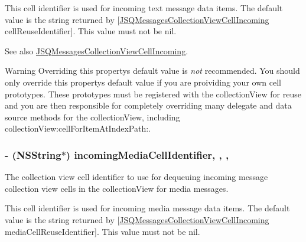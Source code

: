 This cell identifier is used for incoming text message data items. The default value is the string returned by {\ttfamily \mbox{[}\hyperlink{interface_j_s_q_messages_collection_view_cell_incoming}{J\+S\+Q\+Messages\+Collection\+View\+Cell\+Incoming} cell\+Reuse\+Identifier\mbox{]}}. This value must not be {\ttfamily nil}.

\begin{DoxySeeAlso}{See also}
\hyperlink{interface_j_s_q_messages_collection_view_cell_incoming}{J\+S\+Q\+Messages\+Collection\+View\+Cell\+Incoming}.
\end{DoxySeeAlso}
\begin{DoxyWarning}{Warning}
Overriding this property\textquotesingle{}s default value is {\itshape not} recommended. You should only override this property\textquotesingle{}s default value if you are proividing your own cell prototypes. These prototypes must be registered with the collection\+View for reuse and you are then responsible for completely overriding many delegate and data source methods for the collection\+View, including {\ttfamily collection\+View\+:cell\+For\+Item\+At\+Index\+Path\+:}. 
\end{DoxyWarning}
\hypertarget{interface_j_s_q_messages_view_controller_a2803500d4718ae80d36013c83044ec8e}{}
\subsubsection[{incoming\+Media\+Cell\+Identifier}]{\setlength{\rightskip}{0pt plus 5cm}-\/ (N\+S\+String$\ast$) incoming\+Media\+Cell\+Identifier\hspace{0.3cm}{\ttfamily [read]}, {\ttfamily [write]}, {\ttfamily [nonatomic]}, {\ttfamily [copy]}}\label{interface_j_s_q_messages_view_controller_a2803500d4718ae80d36013c83044ec8e}
The collection view cell identifier to use for dequeuing incoming message collection view cells in the collection\+View for media messages.

This cell identifier is used for incoming media message data items. The default value is the string returned by {\ttfamily \mbox{[}\hyperlink{interface_j_s_q_messages_collection_view_cell_incoming}{J\+S\+Q\+Messages\+Collection\+View\+Cell\+Incoming} media\+Cell\+Reuse\+Identifier\mbox{]}}. This value must not be {\ttfamily nil}.

